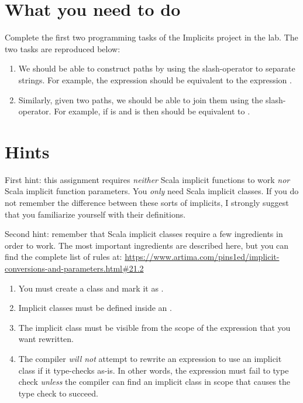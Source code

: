 \documentclass[9pt]{extbook}
\begin{document}
\section{What you need to do}

Complete the first two programming tasks of the Implicits project in the lab.
The two tasks are reproduced below:

\begin{enumerate}

  \item We should be able to construct paths by using the slash-operator to separate strings. 
  For example, the expression  should be equivalent to the expression . 
  
  \item Similarly, given two paths, we should be able to join them using the slash-operator. 
  For example, if  is  and  is  then  should be equivalent to . 
\end{enumerate}

\section{Hints}

First hint: this assignment requires \emph{neither} Scala implicit functions 
to work \emph{nor} Scala implicit function parameters.  
You \emph{only} need Scala implicit classes.  If you do not 
remember the difference between these sorts of implicits, I strongly 
suggest that you familiarize yourself with their definitions.

Second hint: remember that Scala implicit classes require a few ingredients
 in order to work.  The most important ingredients are described here, but 
 you can find the complete list of rules at: \url{https://www.artima.com/pins1ed/implicit-conversions-and-parameters.html#21.2}

\begin{enumerate}
  \item You must create a class and mark it as .
  \item Implicit classes must be defined inside an .
  \item The implicit class must be visible from the scope of the expression that you want rewritten.
  \item The compiler \emph{will not} attempt to rewrite an expression to use an
   implicit class if it type-checks as-is.  In other words, the expression must 
   fail to type check \emph{unless} the compiler can find an implicit class in scope that causes the type check to succeed.
\end{enumerate}
\end{document}
